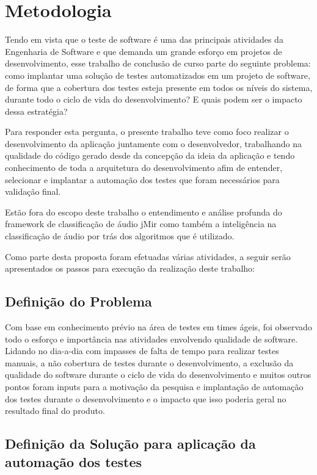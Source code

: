 \chapter{Metodologia}

Tendo em vista que o teste de software é uma das principais atividades da Engenharia 
de Software e que demanda um grande esforço em projetos de desenvolvimento, esse 
trabalho de conclusão de curso parte do seguinte problema: como implantar uma 
solução de testes automatizados em um projeto de software, de forma que a 
cobertura dos testes esteja presente em todos os níveis do sistema, durante todo o 
ciclo de vida do desenvolvimento? E quais podem ser o impacto dessa estratégia?

Para responder esta pergunta, o presente trabalho teve como foco realizar o  desenvolvimento da aplicação juntamente com o desenvolvedor,  trabalhando na qualidade do código gerado desde da concepção da ideia da aplicação e tendo conhecimento de toda a arquitetura do desenvolvimento afim de entender, selecionar e implantar a automação dos testes que foram necessários para validação final.

Estão fora do escopo deste trabalho o entendimento e análise profunda do framework de classificação de áudio jMir como também a inteligência na classificação de áudio por trás dos algoritmos que é utilizado.

Como parte desta proposta foram efetuadas várias atividades, a seguir serão apresentados os passos para execução da realização deste trabalho:

\section{Definição do Problema}

Com base em conhecimento prévio na área de testes em times ágeis,  foi observado todo o esforço e importância nas atividades envolvendo qualidade de software.  Lidando no dia-a-dia com impasses de falta de tempo para realizar testes manuais, a não cobertura de testes durante o desenvolvimento, a exclusão da qualidade do software durante o ciclo de vida do desenvolvimento e muitos outros pontos foram inputs para a motivação da pesquisa e implantação de automação dos testes durante o desenvolvimento e o impacto que isso poderia geral no resultado final do produto.

\section{Definição da Solução para aplicação da automação dos testes}


